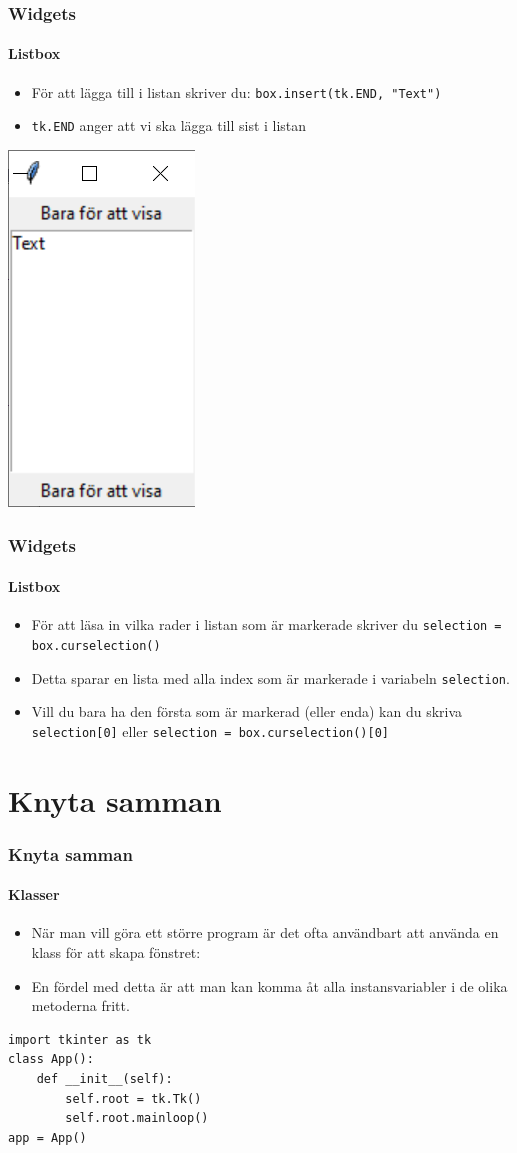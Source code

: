 \documentclass[aspectratio=169]{beamer}
\begin{document}
\begin{frame}[fragile]
	\frametitle{Widgets}
	\framesubtitle{Listbox}
	
	\begin{itemize}
		\item För att lägga till i listan skriver du: \lstinline!box.insert(tk.END, "Text")!
		\item \lstinline!tk.END! anger att vi ska lägga till sist i listan
	\end{itemize}
	
	\begin{center}
		\includegraphics[width=.175\linewidth]{list-box-text.png}
	\end{center}
\end{frame}

\begin{frame}[fragile]
	\frametitle{Widgets}
	\framesubtitle{Listbox}
	
	\begin{itemize}
		\item För att läsa in vilka rader i listan som är markerade skriver du \lstinline!selection = box.curselection()!
		\item Detta sparar en lista med alla index som är markerade i variabeln \lstinline!selection!.
		\item Vill du bara ha den första som är markerad (eller enda) kan du skriva \lstinline!selection[0]! eller \lstinline!selection = box.curselection()[0]!
	\end{itemize}
	
\end{frame}

\section{Knyta samman}

\begin{frame}[fragile]
	\frametitle{Knyta samman}
	\framesubtitle{Klasser}
	
	\begin{itemize}
		\item När man vill göra ett större program är det ofta användbart att använda en klass för att skapa fönstret:
		\item En fördel med detta är att man kan komma åt alla instansvariabler i de olika metoderna fritt. 
	\end{itemize}
	
	\begin{lstlisting}
import tkinter as tk
class App():
    def __init__(self):
        self.root = tk.Tk()
        self.root.mainloop()
app = App()
	\end{lstlisting}
\end{frame}
\end{document}
